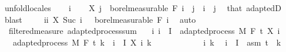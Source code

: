 \begin{isabellebody}
%
\isadelimproof
%
\endisadelimproof
%
\isatagproof
{}\isamarkupfalse%
\ {\isacharparenleft}{\kern0pt}unfold{\isacharunderscore}{\kern0pt}locales{\isacharparenright}{\kern0pt}\isanewline
\ \ \isamarkupfalse%
\ i\isanewline
\ \ \isamarkupfalse%
\ {\isachardoublequoteopen}X\ j\ {\isasymin}\ borel{\isacharunderscore}{\kern0pt}measurable\ {\isacharparenleft}{\kern0pt}F\ i{\isacharparenright}{\kern0pt}{\isachardoublequoteclose}\ \ {\isachardoublequoteopen}j\ {\isasymle}\ i{\isachardoublequoteclose}\ \ j\ \isamarkupfalse%
\ that\ adaptedD\ \isamarkupfalse%
\ blast\isanewline
\ \ \isamarkupfalse%
\ {\isachardoublequoteopen}{\isacharparenleft}{\kern0pt}{\isasymlambda}{\isasymxi}{\isachardot}{\kern0pt}\ {\isasymSum}i{\isacharless}{\kern0pt}i{\isachardot}{\kern0pt}\ X\ {\isacharparenleft}{\kern0pt}Suc\ i{\isacharparenright}{\kern0pt}\ {\isasymxi}{\isacharparenright}{\kern0pt}\ {\isasymin}\ borel{\isacharunderscore}{\kern0pt}measurable\ {\isacharparenleft}{\kern0pt}F\ i{\isacharparenright}{\kern0pt}{\isachardoublequoteclose}\ \isamarkupfalse%
\ auto\isanewline
{}\isamarkupfalse%
%
\endisatagproof
{\isafoldproof}%
%
\isadelimproof
\isanewline
%
\endisadelimproof
\isanewline
{}\isamarkupfalse%
\ {\isacharparenleft}{\kern0pt}\ filtered{\isacharunderscore}{\kern0pt}measure{\isacharparenright}{\kern0pt}\ adapted{\isacharunderscore}{\kern0pt}process{\isacharunderscore}{\kern0pt}sum{\isacharcolon}{\kern0pt}\isanewline
\ \ \ {\isachardoublequoteopen}{\isasymAnd}i{\isachardot}{\kern0pt}\ i\ {\isasymin}\ I\ {\isasymLongrightarrow}\ adapted{\isacharunderscore}{\kern0pt}process\ M\ F\ t\ {\isacharparenleft}{\kern0pt}X\ i{\isacharparenright}{\kern0pt}{\isachardoublequoteclose}\isanewline
\ \ \ {\isachardoublequoteopen}adapted{\isacharunderscore}{\kern0pt}process\ M\ F\ t\ {\isacharparenleft}{\kern0pt}{\isasymlambda}k\ {\isasymxi}{\isachardot}{\kern0pt}\ {\isasymSum}i\ {\isasymin}\ I{\isachardot}{\kern0pt}\ X\ i\ k\ {\isasymxi}{\isacharparenright}{\kern0pt}{\isachardoublequoteclose}\ \isanewline
%
\isadelimproof
%
\endisadelimproof
%
\isatagproof
{}\isamarkupfalse%
\ {\isacharminus}{\kern0pt}\isanewline
\ \ \isacommand{{\isacharbraceleft}{\kern0pt}}\isamarkupfalse%
\isanewline
\ \ \ \ \isamarkupfalse%
\ i\ k\ \isamarkupfalse%
\ {\isachardoublequoteopen}i\ {\isasymin}\ I{\isachardoublequoteclose}\ \ asm{\isacharcolon}{\kern0pt}\ {\isachardoublequoteopen}t\ {\isasymle}\ k{\isachardoublequoteclose}\isanewline

\end{isabellebody}
